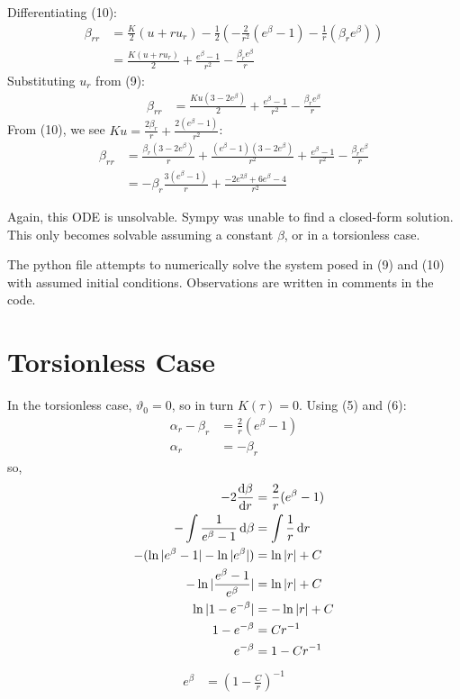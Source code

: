 \documentclass[12pt]{article}
\begin{document}
Differentiating (10):
\begin{align*}
  \beta_{rr} &= \frac{K}{2}(u+ru_r)-\frac{1}{2}(-\frac{2}{r^2}(e^\beta -1)-\frac{1}{r}(\beta_r e^\beta)) \\
  &= \frac{K(u+ru_r)}{2} + \frac{e^\beta - 1}{r^2} - \frac{\beta_r e^\beta}{r}
\end{align*}
Substituting $u_r$ from (9):
\begin{align*}
  \beta_{rr} &= \frac{Ku(3-2e^\beta)}{2} + \frac{e^\beta - 1}{r^2} - \frac{\beta_r e^\beta}{r}
\end{align*}
From (10), we see $Ku = \frac{2\beta_r}{r} + \frac{2(e^\beta - 1)}{r^2}$:
\begin{align}
  \beta_{rr} &= \frac{\beta_r(3-2e^\beta)}{r} + \frac{(e^\beta-1)(3-2e^\beta)}{r^2} + \frac{e^\beta - 1}{r^2} - \frac{\beta_r e^\beta}{r} \nonumber \\
  &= -\beta_r\frac{3(e^\beta - 1)}{r} + \frac{-2e^{2\beta}+6e^\beta-4}{r^2}
\end{align}

Again, this ODE is unsolvable. Sympy was unable to find a closed-form solution. This only becomes solvable assuming a constant $\beta$, or in a torsionless case.

The python file attempts to numerically solve the system posed in (9) and (10) with assumed initial conditions. Observations are written in comments in the code.

\section*{Torsionless Case}

In the torsionless case, $\vartheta_0 = 0$, so in turn $K(\tau) = 0$. Using (5) and (6):
\begin{align}
  \alpha_r - \beta_r &= \frac{2}{r}(e^\beta - 1) \\
  \alpha_r &= -\beta_r
\end{align}
so,
\begin{align*}
  -2\dv{\beta}{r} &= \frac{2}{r}(e^\beta - 1) \\
  -\int\frac{1}{e^\beta - 1}\dd{\beta} &= \int\frac{1}{r}\dd{r} \\
  -(\ln|e^\beta - 1| - \ln|e^\beta|) &= \ln|r| + C \\
  -\ln|\frac{e^\beta - 1}{e^\beta}| &= \ln|r| + C \\
  \ln|1-e^{-\beta}| &= -\ln|r| + C \\
  1-e^{-\beta} &= Cr^{-1} \\
  e^{-\beta} &= 1-Cr^{-1}
\end{align*}
\begin{align}
  e^\beta &= \left(1-\frac{C}{r}\right)^{-1}
\end{align}
\end{document}
